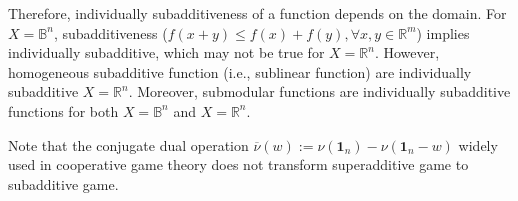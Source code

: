 \documentclass[11pt]{article}\usepackage[]{graphicx}\usepackage[]{xcolor}
\begin{document}
Therefore, individually subadditiveness of a function depends on the domain. For $X=\mathbb{B}^n$, subadditiveness ($f(x+y)\le f(x)+f(y), \forall x, y\in \mathbb{R}^m$) implies individually subadditive, which may not be true for $X=\mathbb{R}^n$. However, homogeneous subadditive function (i.e., sublinear function) are individually subadditive $X=\mathbb{R}^n$. Moreover, submodular functions are individually subadditive functions for both $X=\mathbb{B}^n$ and $X=\mathbb{R}^n$. 

Note that the conjugate dual operation $\overline{\nu}(w):=\nu\left(\mathbf{1}_n\right)-\nu\left(\mathbf{1}_n-w\right)$ widely used in cooperative game theory does not transform superadditive game to subadditive game. 
\end{document}
